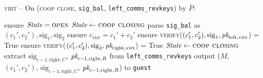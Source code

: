 \begin{center}
  \begin{processbox}{\textsc{virt} -- On (\textsc{coop close},
  \texttt{sig\_bal}, \texttt{left\_comms\_revkeys}) by $\bar{P}$:}
    \begin{algorithmic}[1]
      \State ensure $\itistate = \textsc{open}$
      \State $\itistate \gets \textsc{coop closing}$
      \State parse \texttt{sig\_bal} as $(c_1', c_2'), \mathrm{sig}_1,
      \mathrm{sig}_2$
      \State ensure $c_{\mathrm{virt}} = c_1' + c_2'$
      \State ensure \textsc{verify}($(c_1', c_2'), \mathrm{sig}_1,
      \textit{pk}_{\mathrm{left}, \mathrm{virt}}$) = True
      \State ensure \textsc{verify}($(c_1', c_2'), \mathrm{sig}_2,
      \textit{pk}_{\mathrm{right}, \mathrm{virt}}$) = True
      \State $\itistate \gets \textsc{coop closing}$
      \State extract $\mathrm{sig}_{i-1, \mathrm{right}, C}$, $\textit{pk}_{i-1,
      \mathrm{right}, R}$ from \texttt{left\_comms\_revkeys}
      \State output ($M$, $(c_1', c_2')$, $\mathrm{sig}_{i-1, \mathrm{right}, C}$,
      $\textit{pk}_{i-1, \mathrm{right}, R}$) to \texttt{guest}
      \label{code:virtual-layer:coop-close-intermediary:first-invoke-guest}
      \State {} 
      \label{code:virtual-layer:coop-close-intermediary:first-activation-guest}
      \State {}
      \State {} 
      \State {}
      \State {}
      \label{code:virtual-layer:coop-close-intermediary:left-old-fund-keys}
      \State {}
      \label{code:virtual-layer:coop-close-intermediary:left-interm-comm}
      \State {}
      \label{code:virtual-layer:coop-close-intermediary:left-interm-verify-comm}

\end{algorithmic}
\end{processbox}
\end{center}
